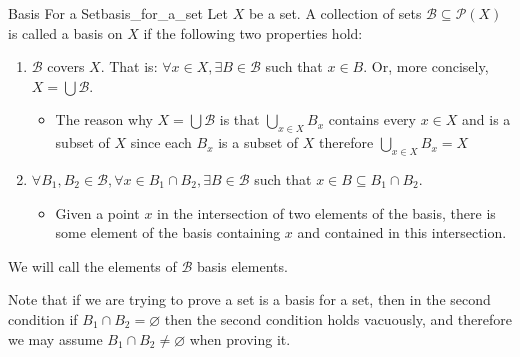 \begin{definition}
{Basis For a Set}{basis_for_a_set}
Let \(X\) be a set. A collection of sets \(\mathcal{B} \subseteq
\mathcal{P}(X)\) is called a basis on \(X\) if the following two properties
hold:
\begin{enumerate}
    \item \(\mathcal{B}\) covers \(X\). That is: \(\forall x \in X, \exists B
    \in \mathcal{B}\) such that \(x \in B \). Or, more concisely, \(X = \bigcup
    \mathcal{B}\).
        \begin{itemize}
            \item The reason why \(X = \bigcup \mathcal{B} \) is that \(\bigcup
            _{x \in X} B_{x} \) contains every \(x \in X \) and is a
            subset of \(X \) since each \(B_{x} \) is a subset of \(X \)
            therefore \(\bigcup _{x \in X} B_{x} = X \)
        \end{itemize}
    \item \(\forall B_{1}, B_{2} \in \mathcal{B}, \forall x \in B_{1} \cap
    B_{2}, \exists B \in \mathcal{B}\) such that \(x \in B \subseteq B_{1} \cap
    B_{2}\).
    \begin{itemize}
        \item Given a point \(x\) in the intersection of two elements of the
        basis, there is some element of the basis containing \(x\) and contained
        in this intersection.
    \end{itemize}
\end{enumerate}
We will call the elements of \(\mathcal{B} \) basis elements.
\end{definition}
Note that if we are trying to prove a set is a basis for a set, then in the
second condition if \( B _{ 1 } \cap B _{ 2 } = \varnothing  \) then the second
condition holds vacuously, and therefore we may assume \( B _{ 1 } \cap  B _{ 2
} \neq \varnothing  \) when proving it.
